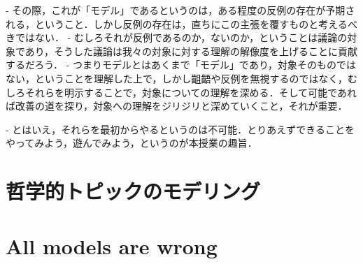 \documentclass[11pt,a4paper, uplatex]{jsarticle}
\begin{document}
- その際，これが「モデル」であるというのは，ある程度の反例の存在が予期される，ということ．しかし反例の存在は，直ちにこの主張を覆すものと考えるべきではない．
- むしろそれが反例であるのか，ないのか，ということは議論の対象であり，そうした議論は我々の対象に対する理解の解像度を上げることに貢献するだろう．
- つまりモデルとはあくまで「モデル」であり，対象そのものではない，ということを理解した上で，しかし齟齬や反例を無視するのではなく，むしろそれらを明示することで，対象についての理解を深める．そして可能であれば改善の道を探り，対象への理解をジリジリと深めていくこと，それが重要．

- とはいえ，それらを最初からやるというのは不可能．とりあえずできることをやってみよう，遊んでみよう，というのが本授業の趣旨．







\section{哲学的トピックのモデリング}

\section{All models are wrong}
\end{document}
